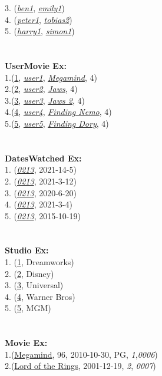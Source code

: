 \documentclass[12pt]{article}
\begin{document}
    3. (\emph{\underline{ben1}}, \emph{\underline{emily1}})\\
    4. (\emph{\underline{peter1}}, \emph{\underline{tobias2}})\\
    5. (\emph{\underline{harry1}}, \emph{\underline{simon1}})\\
    \\ \\
    \textbf{User\textunderscore Movie Ex:}\\
    1.(\underline{1}, \underline{\emph{user1}}, \underline{\emph{Megamind}}, 4)\\
    2.(\underline{2}, \underline{\emph{user2}}, \underline{\emph{Jaws}}, 4)\\
    3.(\underline{3}, \underline{\emph{user3}}, \underline{\emph{Jaws 2}}, 4)\\
    4.(\underline{4}, \underline{\emph{user4}}, \underline{\emph{Finding Nemo}}, 4)\\
    5.(\underline{5}, \underline{\emph{user5}}, \underline{\emph{Finding Dory}}, 4)\\
    \\ \\
    \textbf{Dates\textunderscore Watched Ex:}\\
    1. (\emph{\underline{0213}}, 2021-14-5)\\
    2. (\emph{\underline{0213}}, 2021-3-12)\\
    3. (\emph{\underline{0213}}, 2020-6-20)\\
    4. (\emph{\underline{0213}}, 2021-3-4)\\
    5. (\emph{\underline{0213}}, 2015-10-19)\\
    \\ \\
    \textbf{Studio Ex:}\\
    1. (\underline{1}, Dreamworks)\\
    2. (\underline{2}, Disney)\\
    3. (\underline{3}, Universal)\\
    4. (\underline{4}, Warner Bros)\\
    5. (\underline{5}, MGM)\\
    \\ \\
    \textbf{Movie Ex:}\\
    1.(\underline{Megamind}, 96, 2010-10-30, PG, \emph{1},\emph{0006})\\
    2.(\underline{Lord of the Rings}, 2001-12-19, \emph{2}, \emph{0007})\\
\end{document}
